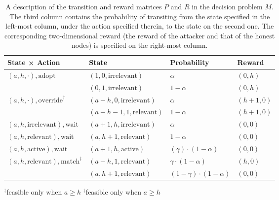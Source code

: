 \begin{table}[h]
\label{Table1}
\centering
\begin{tabular}{|l|l|l|l|}
\hline
\textbf{State × Action}                    & \textbf{State}                    & \textbf{Probability}          & \textbf{Reward}  \\ \hline
$(a,h,\cdot), \text{adopt}$                & $(1,0,\text{irrelevant})$         & $\alpha$                      & $(0,h)$          \\ \cline{2-4} 
                                           & $(0,1,\text{irrelevant})$         & $1-\alpha$                    & $(0,h)$          \\ \hline
$(a,h,\cdot), \text{override}^\dagger$     & $(a-h,0,\text{irrelevant})$       & $\alpha$                      & $(h+1,0)$        \\ \cline{2-4} 
                                           & $(a-h-1,1,\text{relevant})$       & $1-\alpha$                    & $(h+1,0)$        \\ \hline
$(a,h,\text{irrelevant}), \text{wait}$     & $(a+1,h,\text{irrelevant})$       & $\alpha$                      & $(0,0)$          \\ \hline
$(a,h,\text{relevant}), \text{wait}$       & $(a,h+1,\text{relevant})$         & $1-\alpha$                    & $(0,0)$          \\ \hline
$(a,h,\text{active}), \text{wait}$         & $(a+1,h,\text{active})$           & $(\gamma) \cdot (1-\alpha)$   & $(0,0)$          \\ \hline
$(a,h,\text{relevant}), \text{match}^\ddagger$ & $(a-h,1,\text{relevant})$        & $\gamma \cdot (1-\alpha)$     & $(h,0)$          \\ \cline{2-4} 
                                           & $(a,h+1,\text{relevant})$         & $(1-\gamma) \cdot (1-\alpha)$ & $(0,0)$          \\ \hline
\end{tabular}
\caption{A description of the transition and reward matrices $P$ and $R$ in the decision problem $M$. The third column contains the probability of transiting from the state specified in the left-most column, under the action specified therein, to the state on the second one. The corresponding two-dimensional reward (the reward of the attacker and that of the honest nodes) is specified on the right-most column.}
\footnotesize{$^\dagger$feasible only when $a \geq h$}
\footnotesize{$^\ddagger$feasible only when $a \geq h$}
\end{table}

